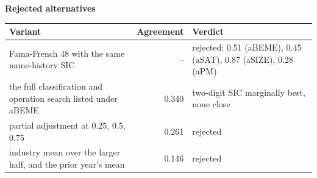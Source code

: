\documentclass[11pt]{article}
\begin{document}
\textbf{Rejected alternatives}\\[2pt]
{\small\begin{longtable}{@{}p{9.6cm}rp{4.3cm}@{}}
\toprule Variant & Agreement & Verdict\\\midrule\endhead
Fama-French 48 with the same name-history SIC & -- & rejected: 0.51 (aBEME), 0.45 (aSAT), 0.87 (aSIZE), 0.28 (aPM)\\
the full classification and operation search listed under aBEME & 0.340 & two-digit SIC marginally best, none close\\
partial adjustment at 0.25, 0.5, 0.75 & 0.261 & rejected\\
industry mean over the larger half, and the prior year's mean & 0.146 & rejected\\
\bottomrule\end{longtable}}
\end{document}
